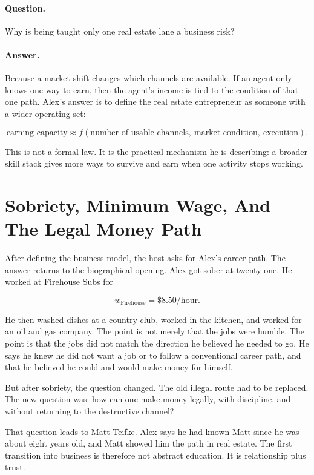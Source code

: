 \paragraph{Question.}
Why is being taught only one real estate lane a business risk?

\paragraph{Answer.}
Because a market shift changes which channels are available. If an agent only knows one way to earn, then the agent's income is tied to the condition of that one path. Alex's answer is to define the real estate entrepreneur as someone with a wider operating set:

\begin{equation}
\text{earning capacity}
\approx
f(\text{number of usable channels},\ \text{market condition},\ \text{execution}).
\end{equation}

This is not a formal law. It is the practical mechanism he is describing: a broader skill stack gives more ways to survive and earn when one activity stops working.

\section{Sobriety, Minimum Wage, And The Legal Money Path}

After defining the business model, the host asks for Alex's career path. The answer returns to the biographical opening. Alex got sober at twenty-one. He worked at Firehouse Subs for

\begin{equation}
w_{\text{Firehouse}} = \$8.50/\text{hour}.
\end{equation}

He then washed dishes at a country club, worked in the kitchen, and worked for an oil and gas company. The point is not merely that the jobs were humble. The point is that the jobs did not match the direction he believed he needed to go. He says he knew he did not want a job or to follow a conventional career path, and that he believed he could and would make money for himself.

But after sobriety, the question changed. The old illegal route had to be replaced. The new question was: how can one make money legally, with discipline, and without returning to the destructive channel?

That question leads to Matt Teifke. Alex says he had known Matt since he was about eight years old, and Matt showed him the path in real estate. The first transition into business is therefore not abstract education. It is relationship plus trust.

